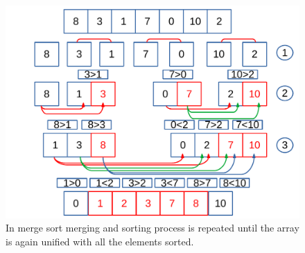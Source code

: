 \begin{figure}[H]
	\begin{center}
		\includegraphics[scale=.52]{chapters/searchandsorting/images/sorting_6.pdf}
		\caption[Merge sort algorithm.]{In merge sort merging and sorting process is repeated until the array is again unified with all the elements sorted.}
		\label{sorting_6}
	\end{center}
\end{figure}

